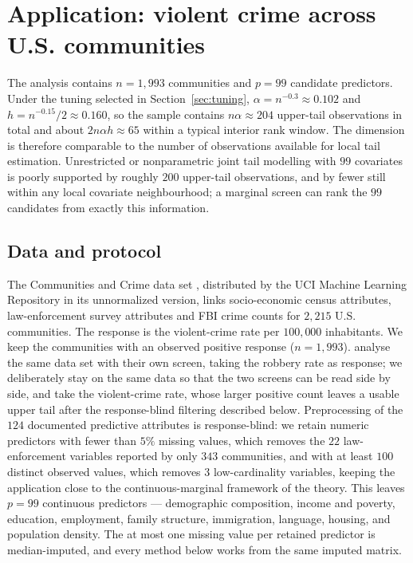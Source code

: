 \section{Application: violent crime across U.S. communities}
\label{sec:realdata}

The analysis contains $n=1{,}993$ communities and $p=99$ candidate
predictors. Under the tuning selected in Section~\ref{sec:tuning},
$\alpha=n^{-0.3}\approx0.102$ and $h=n^{-0.15}/2\approx0.160$, so the
sample contains $n\alpha\approx204$ upper-tail observations in total and
about $2n\alpha h\approx65$ within a typical interior rank window. The
dimension is therefore comparable to the number of observations
available for local tail estimation. Unrestricted or nonparametric joint
tail modelling with $99$ covariates is poorly supported by roughly $200$
upper-tail observations, and by fewer still within any local covariate
neighbourhood; a marginal screen can rank the $99$ candidates from
exactly this information.

\subsection{Data and protocol}

The Communities and Crime data set
\citep{redmond2002}, distributed by the UCI Machine Learning Repository
in its unnormalized version, links socio-economic census attributes,
law-enforcement survey attributes and FBI crime counts for $2{,}215$ U.S.
communities. The response is the violent-crime rate per $100{,}000$
inhabitants. We keep the communities with an observed positive response
($n=1{,}993$). \citet{yoshidaUmezu2026} analyse the same data set with
their own screen, taking the robbery rate as response; we deliberately
stay on the same data so that the two screens can be read side by side,
and take the violent-crime rate, whose larger positive count leaves a
usable upper tail after the response-blind filtering described below. Preprocessing of the $124$ documented predictive
attributes is response-blind: we retain numeric predictors with fewer
than $5\%$ missing values, which removes the $22$ law-enforcement
variables reported by only $343$ communities, and with at least $100$
distinct observed values, which removes $3$ low-cardinality variables,
keeping the application close to the continuous-marginal framework of
the theory. This leaves $p=99$ continuous predictors --- demographic
composition, income and poverty, education, employment, family
structure, immigration, language, housing, and population density. The
at most one missing value per retained predictor is median-imputed, and
every method below works from the same imputed matrix.

